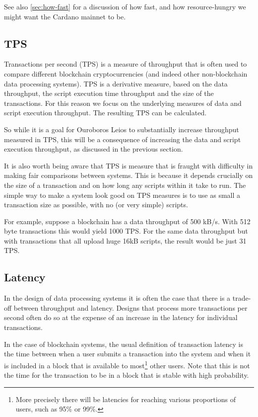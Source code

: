 \documentclass[11pt,a4paper]{article}
\begin{document}
See also \cref{sec:how-fast} for a discussion of how fast, and how
resource-hungry we might want the Cardano mainnet to be.

\subsection{TPS}
\label{sec:TPS}

Transactions per second (TPS) is a measure of throughput that is often used to
compare different blockchain cryptocurrencies (and indeed other non-blockchain
data processing systems). TPS is a derivative measure, based on the data
throughput, the script execution time throughput and the size of the
transactions. For this reason we focus on the underlying measures of data and
script execution throughput. The resulting TPS can be calculated.

So while it is a goal for Ouroboros Leios to substantially increase throughput
measured in TPS, this will be a consequence of increasing the data and
script execution throughput, as discussed in the previous section.

It is also worth being aware that TPS is measure that is fraught with difficulty
in making fair comparisons between systems. This is because it depends crucially
on the size of a transaction and on how long any scripts within it take to run.
The simple way to make a system look good on TPS measures is to use as small a
transaction size as possible, with no (or very simple) scripts.

For example, suppose a blockchain has a data throughput of 500 kB/s. With 512
byte transactions this would yield 1000 TPS. For the same data throughput
but with transactions that all upload huge 16kB scripts, the result would be
just 31 TPS.

\subsection{Latency}

In the design of data processing systems it is often the case that there is a
trade-off between throughput and latency. Designs that process more transactions
per second often do so at the expense of an increase in the latency for
individual transactions.

In the case of blockchain systems, the usual definition of transaction latency
is the time between when a user submits a transaction into the system and when
it is included in a block that is available to most\footnote{More precisely
there will be latencies for reaching various proportions of users, such as 95\%
or 99\%.} other users. Note that this is not the time for the transaction to be
in a block that is stable with high probability.
\end{document}
